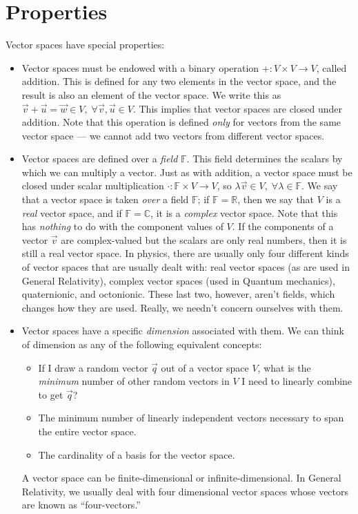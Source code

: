 \section{Properties}
Vector spaces have special properties:
\begin{itemize}
    \item Vector spaces must be endowed with a binary operation $+ : V \times V \to V$, called addition.
    This is defined for any two elements in the vector space, and the result is also an element of the vector space.
    We write this as $\vec{v} + \vec{u} = \vec{w} \in V,\;\forall \vec{v},\vec{u} \in V$.
    This implies that vector spaces are closed under addition.
    Note that this operation is defined \emph{only} for vectors from the same vector space --- we cannot add two vectors from different vector spaces.
    \item Vector spaces are defined over a \emph{field} $\mathbb{F}$.
    This field determines the scalars by which we can multiply a vector. Just as with addition, a vector space must be closed under scalar multiplication $\cdot : \mathbb{F} \times V \to V$, so $\lambda\vec{v} \in V,\;\forall \lambda \in \mathbb{F}$.
    We say that a vector space is taken \emph{over} a field $\mathbb{F}$; if $\mathbb{F} = \mathbb{R}$, then we say that $V$ is a \emph{real} vector space, and if $\mathbb{F} = \mathbb{C}$, it is a \emph{complex} vector space. Note that this has \emph{nothing} to do with the component values of $V$.
    If the components of a vector $\vec{v}$ are complex-valued but the scalars are only real numbers, then it is still a real vector space.
    In physics, there are usually only four different kinds of vector spaces that are usually dealt with: real vector spaces (as are used in General Relativity), complex vector spaces (used in Quantum mechanics), quaternionic, and octonionic.
    These last two, however, aren't fields, which changes how they are used. Really, we needn't concern ourselves with them.
    \item Vector spaces have a specific \emph{dimension} associated with them. We can think of dimension as any of the following equivalent concepts:
        \begin{itemize}
            \item If I draw a random vector $\vec{q}$ out of a vector space $V$, what is the \emph{minimum} number of other random vectors in $V$ I need to linearly combine to get $\vec{q}$?
            \item The minimum number of linearly independent vectors necessary to span the entire vector space.
            \item The cardinality of a basis for the vector space.
        \end{itemize}
    A vector space can be finite-dimensional or infinite-dimensional. In General Relativity, we usually deal with four dimensional vector spaces whose vectors are known as ``four-vectors.''
\end{itemize}

